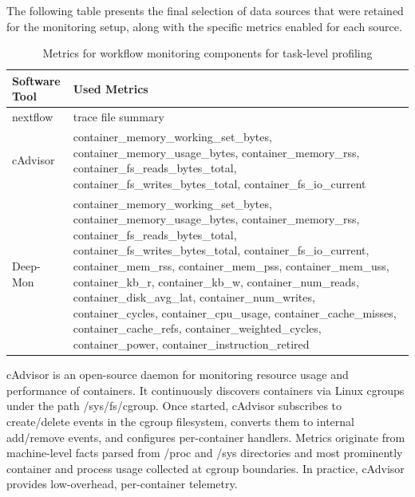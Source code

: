 The following table presents the final selection of data sources that were retained for the monitoring setup, along with the specific metrics enabled for each source.

\begin{table}[H]
    \centering
    \renewcommand{\arraystretch}{1.2}
    \setlength{\tabcolsep}{8pt}
    \small
    \begin{tabularx}{\textwidth}{
            >{\raggedright\arraybackslash}X
            >{\raggedright\arraybackslash}X
        }
        \toprule
        \textbf{Software Tool} & \textbf{Used Metrics} \\
        \midrule

        nextflow               &
        trace file summary                             \\

        \midrule
        cAdvisor               &
        container\_memory\_working\_set\_bytes,
        container\_memory\_usage\_bytes,
        container\_memory\_rss,
        container\_fs\_reads\_bytes\_total,
        container\_fs\_writes\_bytes\_total,
        container\_fs\_io\_current                     \\

        \midrule
        Deep-Mon               &
        container\_memory\_working\_set\_bytes,
        container\_memory\_usage\_bytes,
        container\_memory\_rss,
        container\_fs\_reads\_bytes\_total,
        container\_fs\_writes\_bytes\_total,
        container\_fs\_io\_current,
        container\_mem\_rss,
        container\_mem\_pss,
        container\_mem\_uss,
        container\_kb\_r,
        container\_kb\_w,
        container\_num\_reads,
        container\_disk\_avg\_lat,
        container\_num\_writes,
        container\_cycles,
        container\_cpu\_usage,
        container\_cache\_misses,
        container\_cache\_refs,
        container\_weighted\_cycles,
        container\_power,
        container\_instruction\_retired                \\

        \bottomrule
    \end{tabularx}%
    \small
    \caption{Metrics for workflow monitoring components for task-level profiling}
    \label{tab:workflow_results}
\end{table}

cAdvisor is an open-source daemon for monitoring resource usage and performance of containers. It continuously discovers containers via Linux cgroups under the path /sys/fs/cgroup. Once started, cAdvisor subscribes to create/delete events in the cgroup filesystem, converts them to internal add/remove events, and configures per-container handlers. Metrics originate from machine-level facts parsed from /proc and /sys directories and most prominently container and process usage collected at cgroup boundaries. In practice, cAdvisor provides low-overhead, per-container telemetry.

